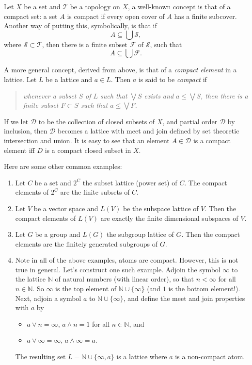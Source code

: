 \documentclass[12pt]{article}
\begin{document}
Let $X$ be a set and $\mathcal{T}$ be a topology on $X$, a well-known concept is that of a compact set: a set $A$ is compact if every open cover of $A$ has a finite subcover.  Another way of putting this, symbolically, is that if $$A\subseteq \bigcup \mathcal{S},$$ where $\mathcal{S}\subset \mathcal{T}$, then there is a finite subset $\mathcal{F}$ of $\mathcal{S}$, such that 
$$A\subseteq \bigcup \mathcal{F}.$$

A more general concept, derived from above, is that of a \emph{compact element} in a lattice.  Let $L$ be a lattice and $a\in L$.  Then $a$ is said to be \emph{compact} if 
\begin{quote}\emph{
whenever a subset $S$ of $L$ such that $\bigvee S$ exists and $a\le \bigvee S$, then there is a finite subset $F\subset S$ such that $a\le \bigvee F$.}
\end{quote}

If we let $\mathcal{D}$ to be the collection of closed subsets of $X$, and partial order $\mathcal{D}$ by inclusion, then $\mathcal{D}$ becomes a lattice with meet and join defined by set theoretic intersection and union.  It is easy to see that an element $A\in\mathcal{D}$ is a compact element iff $D$ is a compact closed subset in $X$.

Here are some other common examples:
\begin{enumerate}
\item Let $C$ be a set and $2^C$ the subset lattice (power set) of $C$.  The compact elements of $2^C$ are the finite subsets of $C$.
\item Let $V$ be a vector space and $L(V)$ be the subspace lattice of $V$.  Then the compact elements of $L(V)$ are exactly the finite dimensional subspaces of $V$.
\item Let $G$ be a group and $L(G)$ the subgroup lattice of $G$.  Then the compact elements are the finitely generated subgroups of $G$.
\item Note in all of the above examples, atoms are compact.  However, this is not true in general.  Let's construct one such example.  Adjoin  the symbol $\infty$ to the lattice $\mathbb{N}$ of natural numbers (with linear order), so that $n<\infty$ for all $n\in \mathbb{N}$.  So $\infty$ is the top element of $\mathbb{N}\cup\lbrace \infty\rbrace$ (and $1$ is the bottom element!).  Next, adjoin a symbol $a$ to $\mathbb{N}\cup\lbrace \infty\rbrace$, and define the meet and join properties with $a$ by
\begin{itemize}
\item $a\vee n=\infty$, $a\wedge n=1$ for all $n\in\mathbb{N}$, and
\item $a\vee\infty =\infty$, $a\wedge\infty = a$.
\end{itemize}
The resulting set $L=\mathbb{N}\cup\lbrace \infty,a\rbrace$ is a lattice where $a$ is a non-compact atom.
\end{enumerate}
\end{document}
